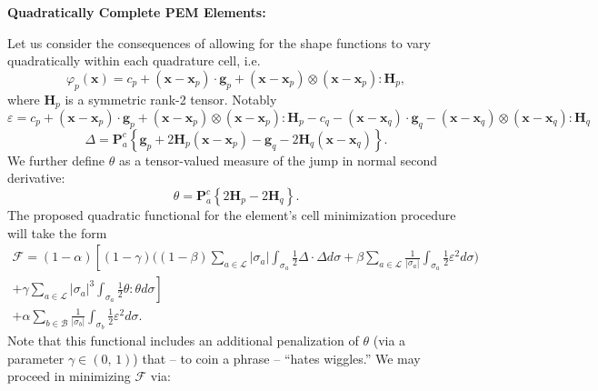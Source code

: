 \documentclass[11pt]{article} %
\begin{document}
\newpage

\begin{center}
\textbf{Quadratically Complete PEM Elements:}
\end{center}

Let us consider the consequences of allowing for the shape functions to vary quadratically within each quadrature cell, i.e.
\begin{equation}
	\varphi_p (\mathbf{x}) = c_p + (\mathbf{x} - \mathbf{x}_p) \cdot \mathbf{g}_p + (\mathbf{x} - \mathbf{x}_p) \otimes (\mathbf{x} - \mathbf{x}_p) \colon \mathbf{H}_p,
\end{equation}
where $\mathbf{H}_p$ is a symmetric rank-2 tensor. Notably
\begin{equation}
	\varepsilon = c_p + (\mathbf{x} - \mathbf{x}_p) \cdot \mathbf{g}_p + (\mathbf{x} - \mathbf{x}_p) \otimes (\mathbf{x} - \mathbf{x}_p) \colon \mathbf{H}_p - c_q - (\mathbf{x} - \mathbf{x}_q) \cdot \mathbf{g}_q - (\mathbf{x} - \mathbf{x}_q) \otimes (\mathbf{x} - \mathbf{x}_q) \colon \mathbf{H}_q
\end{equation}
\begin{equation}
	\Delta = \mathbf{P}^c_a \left\{ \mathbf{g}_p + 2 \mathbf{H}_p (\mathbf{x} - \mathbf{x}_p) - \mathbf{g}_q - 2 \mathbf{H}_q (\mathbf{x} - \mathbf{x}_q) \right\}.
\end{equation}
We further define $\theta$ as a tensor-valued measure of the jump in normal second derivative:
\begin{equation}
	\theta = \mathbf{P}^c_a \left\{ 2\mathbf{H}_p - 2 \mathbf{H}_q \right\} .
\end{equation}
The proposed quadratic functional for the element's cell minimization procedure will take the form
\begin{eqnarray}
	\mathcal{F} = (1-\alpha) \left[ (1 - \gamma) \bigg( (1-\beta) \sum_{a \in \mathcal{L}} | \sigma_a | \int_{\sigma_a} \frac{1}{2} \Delta \cdot \Delta d \sigma + \beta \sum_{a \in \mathcal{L}} \frac{1}{| \sigma_a |} \int_{\sigma_a} \frac{1}{2} \varepsilon^2 d \sigma \bigg) \right. \nonumber \\ + \left. \gamma \sum_{a \in \mathcal{L}} | \sigma_a |^3 \int_{\sigma_a} \frac{1}{2} \theta \colon \theta d \sigma \right] \nonumber \\ + \alpha \sum_{b \in \mathcal{B}} \frac{1}{| \sigma_b |} \int_{\sigma_b} \frac{1}{2} \varepsilon^2 d \sigma.
\end{eqnarray}
Note that this functional includes an additional penalization of $\theta$ (via a parameter $\gamma \in (0, \, 1)$) that -- to coin a phrase -- ``hates wiggles.'' We may proceed in minimizing $\mathcal{F}$ via:
\end{document}
